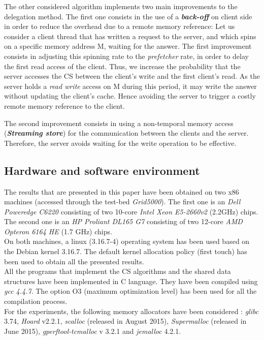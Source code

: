 \documentclass[10pt]{article}											%
\begin{document}
The other considered algorithm implements two main improvements to the delegation method.   The first one consists in the use of a \textbf{\textit{back-off}} on client side in order to reduce the overhead due to a remote memory reference:
Let us consider a client thread that has written a request to the server, and which spins on a specific memory address M, waiting for the answer.   The first improvement consists in adjusting this spinning rate to the \textit{prefetcher} rate, in order to delay the first read access of the client.   Thus, we increase the probability that the server accesses the CS between the client's write and the first client's read.   As the server holds a \emph{read write} access on M during this period, it may write the answer without updating the client's cache.   Hence avoiding the server to trigger a costly remote memory reference to the client. 

The second improvement consists in using a non-temporal memory access (\textbf{\textit{Streaming store}}) for the communication between the clients and the server.   Therefore, the server avoids waiting for the write operation to be effective.



\subsection{Hardware and software environment}
The results that are presented in this paper have been obtained on two x86 machines (accessed through the test-bed \textit{Grid5000}).   The first one is an \textit{Dell Poweredge C6220} consisting of two 10-core \textit{Intel Xeon E5-2660v2} (2.2GHz) chips.   The second one is an \textit{HP Proliant DL165 G7} consisting of two 12-core \textit{AMD Opteron 6164 HE} (1.7 GHz) chips.\\
On both machines, a linux (3.16.7-4) operating system has been used based on the Debian kernel 3.16.7.   The default kernel allocation policy (first touch) has been used to obtain all the presented results.\\
All the programs that implement the CS algorithms and the shared data structures have been implemented in C language.   They have been compiled using \textit{gcc 4.4.7}.  The option O3 (maximum optimization level) has been used for all the compilation process.\\

For the experiments, the following memory allocators have been considered : \emph{glibc} 3.74, \emph{Hoard} v2.2.1, \emph{scalloc} (released in August 2015), \emph{Supermalloc} (released in June 2015), \emph{gperftool-tcmalloc} v 3.2.1 and \emph{jemalloc} 4.2.1. 
\end{document}
